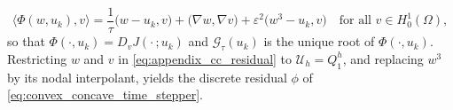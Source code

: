 \documentclass{article} %
\begin{document}
\begin{equation}\label{eq:appendix_cc_residual}
   \big\langle \Phi(w, u_k), v \big\rangle
   =
   \frac1\tau\big(w - u_k, v\big) + \big(\nabla w, \nabla v\big) + \varepsilon^2\big(w^3 - u_k, v\big)
   \quad \text{for all } v\in H^1_0(\Omega),
\end{equation}
so that $\Phi(\cdot, u_k) = D_v J(\cdot\,; u_k)$ and $\mathcal G_\tau(u_k)$ is the unique root of $\Phi(\cdot, u_k)$. Restricting $w$ and $v$ in \eqref{eq:appendix_cc_residual} to $\mathcal U_h = Q_1^h$, and replacing $w^3$ by its nodal interpolant, yields the discrete residual $\phi$ of \eqref{eq:convex_concave_time_stepper}.
\end{document}
